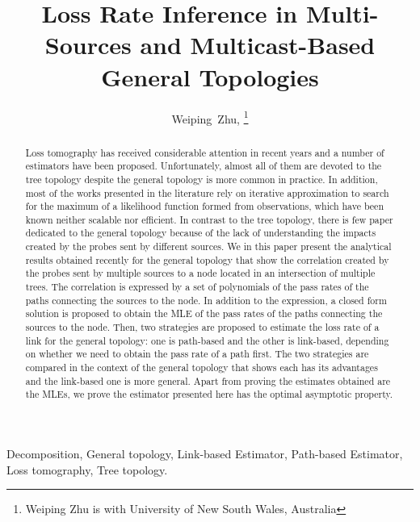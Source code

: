 \documentclass[10pt,twocolumn]{IEEEtran}
\begin{document}


\setlength{\parindent}{1pc}


\title{Loss Rate Inference in Multi-Sources and Multicast-Based General Topologies}
\author{Weiping~Zhu,  \thanks{Weiping Zhu is with University of New South Wales, Australia}}
\date{}
\maketitle

\begin{abstract}
 Loss tomography has received considerable attention in
recent years and a number of estimators have been proposed.
Unfortunately, almost all of them are devoted to
 the tree topology despite the general topology is more common in practice. In addition,  most of the works presented in the literature
 rely on iterative
approximation to search for the maximum of a likelihood function
formed from observations, which have been known neither scalable nor
efficient. In contrast to the tree topology, there is few paper
dedicated to the general topology because of the lack of understanding
the impacts created by the probes sent by different sources. We in
this paper present the analytical results obtained recently for the
general topology that show the correlation created by the probes sent
by multiple sources to a node located in an intersection of multiple
trees. The correlation is expressed by a set of polynomials of the
pass rates of the paths connecting the sources to the node. In
addition to the expression, a closed form solution is proposed to
obtain the MLE of the pass rates of the paths connecting the sources
to the node. Then, two strategies are proposed to estimate the loss
rate of a link for the general topology: one is path-based and the
other is link-based, depending on whether we need to obtain the pass
rate of a path first. The two strategies are compared in the context
of the general topology that shows each has its advantages and the
link-based one is more general. Apart from proving the estimates
obtained are the MLEs, we prove the estimator presented here has the
optimal asymptotic property.
\end{abstract}

\begin{IEEEkeywords}
 Decomposition, General topology, Link-based Estimator, Path-based Estimator, Loss tomography,
 Tree topology.
\end{IEEEkeywords}
\end{document}
